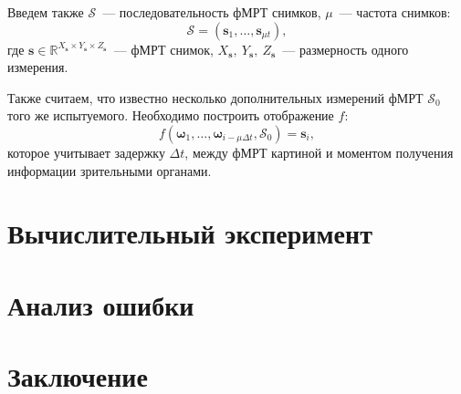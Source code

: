 \documentclass[12pt,twoside]{article}
\begin{document}
Введем также $\mathcal{S}$~--- последовательность фМРТ снимков,  $\mu$~--- частота снимков:
\begin{equation}
    \mathcal{S} = (\bm{s}_{1}, \dots, \bm{s}_{\mu t}),
\end{equation}
где $\bm{s} \in \mathbb{R}^{X_{\bm{s}} \times Y_{\bm{s}} \times Z_{\bm{s}}}$~--- фМРТ снимок, $X_{\bm{s}},~Y_{\bm{s}},~Z_{\bm{s}}$~--- размерность одного измерения.

Также считаем, что известно несколько дополнительных измерений фМРТ $\mathcal{S}_0$ того же испытуемого.
Необходимо построить отображение $f$:
\begin{equation}
    f(\bm{\omega}_{1}, \dots, \bm{\omega}_{i - \mu \Delta t}, \mathcal{S}_0) = \bm{s}_i, 
\end{equation}
которое учитывает задержку $\Delta t$, между фМРТ картиной и моментом получения информации зрительными органами.
\section{Вычислительный эксперимент}


\section{Анализ ошибки}

\section{Заключение}









\end{document}
